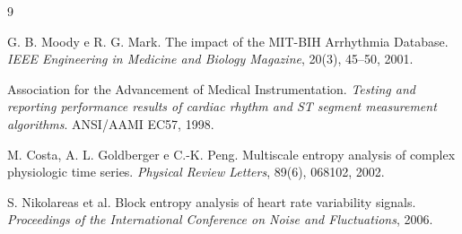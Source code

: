\documentclass[12pt,a4paper]{article}
\begin{document}
\begin{thebibliography}{9}

G. B. Moody e R. G. Mark. The impact of the MIT-BIH Arrhythmia Database. \textit{IEEE Engineering in Medicine and Biology Magazine}, 20(3), 45--50, 2001.

Association for the Advancement of Medical Instrumentation. \textit{Testing and reporting performance results of cardiac rhythm and ST segment measurement algorithms}. ANSI/AAMI EC57, 1998.

M. Costa, A. L. Goldberger e C.-K. Peng. Multiscale entropy analysis of complex physiologic time series. \textit{Physical Review Letters}, 89(6), 068102, 2002.

S. Nikolareas et al. Block entropy analysis of heart rate variability signals. \textit{Proceedings of the International Conference on Noise and Fluctuations}, 2006.

\end{thebibliography}
\end{document}
